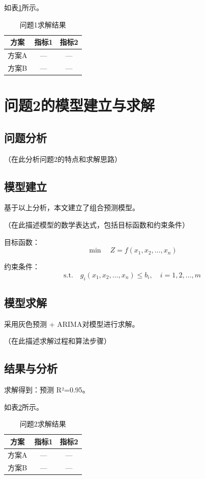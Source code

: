 \documentclass[12pt,a4paper]{article}
\begin{document}
如表\ref{tab:result1}所示。

\begin{table}[H]
  \centering
  \caption{问题1求解结果}
  \label{tab:result1}
  \begin{tabular}{ccc}
    \toprule
    方案 & 指标1 & 指标2 \\
    \midrule
    方案A & — & — \\
    方案B & — & — \\
    \bottomrule
  \end{tabular}
\end{table}

\section{问题2的模型建立与求解}
\subsection{问题分析}
（在此分析问题2的特点和求解思路）

\subsection{模型建立}
基于以上分析，本文建立了组合预测模型。

（在此描述模型的数学表达式，包括目标函数和约束条件）

目标函数：
\begin{equation}
\min \quad Z = f(x_1, x_2, \ldots, x_n)
\end{equation}

约束条件：
\begin{equation}
\text{s.t.} \quad g_i(x_1, x_2, \ldots, x_n) \leq b_i, \quad i = 1, 2, \ldots, m
\end{equation}

\subsection{模型求解}
采用灰色预测 + ARIMA对模型进行求解。

（在此描述求解过程和算法步骤）

\subsection{结果与分析}
求解得到：预测 R²=0.95。

如表\ref{tab:result2}所示。

\begin{table}[H]
  \centering
  \caption{问题2求解结果}
  \label{tab:result2}
  \begin{tabular}{ccc}
    \toprule
    方案 & 指标1 & 指标2 \\
    \midrule
    方案A & — & — \\
    方案B & — & — \\
    \bottomrule
  \end{tabular}
\end{table}
\end{document}
